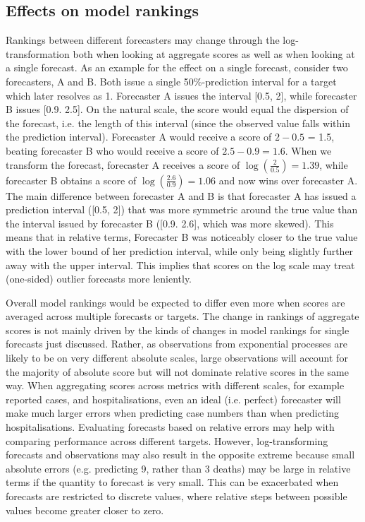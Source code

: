 \documentclass{article}
\begin{document}
\subsection{Effects on model rankings}
Rankings between different forecasters may change through the log-transformation both when looking at aggregate scores as well as when looking at a single forecast. As an example for the effect on a single forecast, consider two forecasters, A and B. Both issue a single 50\%-prediction interval for a target which later resolves as 1. Forecaster A issues the interval [0.5, 2], while forecaster B issues [0.9. 2.5]. On the natural scale, the score would equal the dispersion of the forecast, i.e. the length of this interval (since the observed value falls within the prediction interval). Forecaster A would receive a score of $2 - 0.5$ = 1.5, beating forecaster B who would receive a score of $2.5 - 0.9 = 1.6$. When we transform the forecast, forecaster A receives a score of $\log (\frac{2}{0.5}) = 1.39$, while forecaster B obtains a score of $\log (\frac{2.6}{0.9}) = 1.06$ and now wins over forecaster A. The main difference between forecaster A and B is that forecaster A has issued a prediction interval ([0.5, 2]) that was more symmetric around the true value than the interval issued by forecaster B ([0.9. 2.6], which was more skewed). This means that in relative terms, Forecaster B was noticeably closer to the true value with the lower bound of her prediction interval, while only being slightly further away with the upper interval. This implies that scores on the log scale may treat (one-sided) outlier forecasts more leniently. 

Overall model rankings would be expected to differ even more when scores are averaged across multiple forecasts or targets. The change in rankings of aggregate scores is not mainly driven by the kinds of changes in model rankings for single forecasts just discussed. Rather, as observations from exponential processes are likely to be on very different absolute scales, large observations will account for the majority of absolute score but will not dominate relative scores in the same way. When aggregating scores across metrics with different scales, for example reported cases, and hospitalisations, even an ideal (i.e. perfect) forecaster will make much larger errors when predicting case numbers than when predicting hospitalisations. Evaluating forecasts based on relative errors may help with comparing performance across different targets. However, log-transforming forecasts and observations may also result in the opposite extreme because small absolute errors (e.g. predicting 9, rather than 3 deaths) may be large in relative terms if the quantity to forecast is very small. This can be exacerbated when forecasts are restricted to discrete values, where relative steps between possible values become greater closer to zero. 
\end{document}
